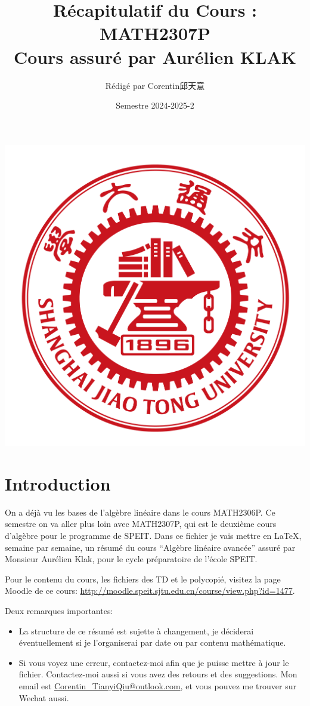\documentclass{article}
\title{\textbf{Récapitulatif du Cours : MATH2307P} \\ Cours assuré par Aurélien KLAK}
\author{Rédigé par Corentin邱天意}
\date{Semestre 2024-2025-2}
\begin{document}
\maketitle

\centerline{\includegraphics[scale=0.4]{sjtu}}

\newpage

\section*{Introduction}

On a déjà vu les bases de l'algèbre linéaire dans le cours MATH2306P. Ce semestre on va aller plus loin avec MATH2307P, qui est le deuxième cours d'algèbre pour le programme de SPEIT. Dans ce fichier je vais mettre en \LaTeX , semaine par semaine, un résumé du cours ``Algèbre linéaire avancée'' assuré par Monsieur Aurélien Klak, pour le cycle préparatoire de l'école SPEIT.

Pour le contenu du cours, les fichiers des TD et le polycopié, visitez la page Moodle de ce cours: \url{http://moodle.speit.sjtu.edu.cn/course/view.php?id=1477}.

Deux remarques importantes:

\begin{itemize}

\item La structure de ce résumé est sujette à changement, je déciderai éventuellement si je l'organiserai par date ou par contenu mathématique.
\item Si vous voyez une erreur, contactez-moi afin que je puisse mettre à jour le fichier. Contactez-moi aussi si vous avez des retours et des suggestions. Mon email est \url{Corentin\_TianyiQiu@outlook.com}, et vous pouvez me trouver sur Wechat aussi.

\end{itemize}
\end{document}
